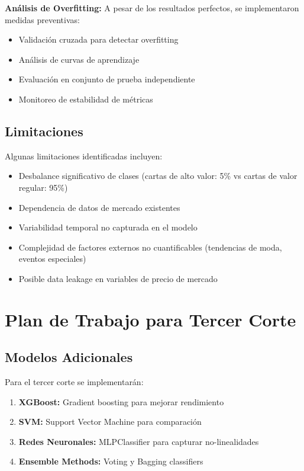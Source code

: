 \documentclass[12pt,letterpaper]{article}
\begin{document}
\textbf{Análisis de Overfitting:}
A pesar de los resultados perfectos, se implementaron medidas preventivas:
\begin{itemize}
    \item Validación cruzada para detectar overfitting
    \item Análisis de curvas de aprendizaje
    \item Evaluación en conjunto de prueba independiente
    \item Monitoreo de estabilidad de métricas
\end{itemize}

\subsection{Limitaciones}

Algunas limitaciones identificadas incluyen:
\begin{itemize}
    \item Desbalance significativo de clases (cartas de alto valor: 5\% vs cartas de valor regular: 95\%)
    \item Dependencia de datos de mercado existentes
    \item Variabilidad temporal no capturada en el modelo
    \item Complejidad de factores externos no cuantificables (tendencias de moda, eventos especiales)
    \item Posible data leakage en variables de precio de mercado
\end{itemize}

\section{Plan de Trabajo para Tercer Corte}

\subsection{Modelos Adicionales}

Para el tercer corte se implementarán:
\begin{enumerate}
    \item \textbf{XGBoost:} Gradient boosting para mejorar rendimiento
    \item \textbf{SVM:} Support Vector Machine para comparación
    \item \textbf{Redes Neuronales:} MLPClassifier para capturar no-linealidades
    \item \textbf{Ensemble Methods:} Voting y Bagging classifiers
\end{enumerate}
\end{document}
